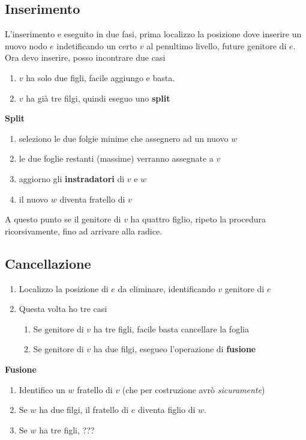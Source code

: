 \documentclass{article}
\begin{document}
\subsection*{Inserimento}
L'inserimento e eseguito in due fasi, prima localizzo la posizione dove inserire un nuovo nodo \(e\) indetificando un certo \(v\) al penultimo livello, future genitore di \(e\). \\
Ora devo inserire, posso incontrare due casi
\begin{enumerate}
  \item \(v\) ha solo due figli, facile aggiungo e basta.
  \item \(v\) ha già tre filgi, quindi eseguo uno \textbf{split}
\end{enumerate}
\textbf{Split}
\begin{enumerate}
  \item seleziono le due folgie minime che assegnero ad un nuovo \(w\)
  \item le due foglie restanti (massime) verranno assegnate a \(v\)
  \item aggiorno gli \textbf{instradatori} di \(v\) e \(w\)
  \item il nuovo \(w\) diventa fratello di \(v\)
\end{enumerate}
A questo punto se il genitore di \(v\) ha quattro figlio, ripeto la procedura ricorsivamente, fino ad arrivare alla radice.
\subsection*{Cancellazione}
\begin{enumerate}
  \item Localizzo la posizione di \(e\) da eliminare, identificando \(v\) genitore di \(e\)
  \item Questa volta ho tre casi
        \begin{enumerate}
          \item Se genitore di \(v\) ha tre figli, facile basta cancellare la foglia
          \item Se genitore di \(v\) ha due filgi, esegueo l'operazione di \textbf{fusione}
        \end{enumerate}
\end{enumerate}
\textbf{Fusione}
\begin{enumerate}
  \item Identifico un \(w\) fratello di \(v\) (che per costruzione avrò \emph{sicuramente})
  \item Se \(w\) ha due filgi, il fratello di \(e\) diventa figlio di \(w\).
  \item Se \(w\) ha tre figli, ???
\end{enumerate}
\pagebreak
\end{document}
